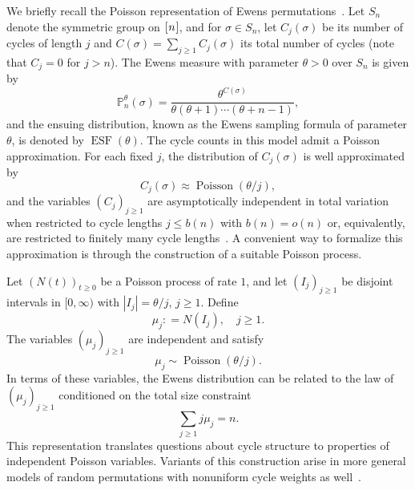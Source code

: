 \documentclass{amsart}
\theoremstyle{definition}
\theoremstyle{remark}
\numberwithin{equation}{section}
\newcommand{\mku}{\mkern1mu}
\newcommand{\deq}{\mathrel{\mathop:}=}
\DeclareMathOperator{\ESF}{ESF}
\DeclareMathOperator{\Poi}{Poisson}
\begin{document}
We briefly recall the Poisson representation of Ewens permutations~\cite{ABT2003,Arratia1992,Pitman2006}. Let $S_{n}$ denote the symmetric group on $[\mku{n}\mku]$, and for $\sigma \in S_{n}$, let $C_{j}(\sigma)$ be its number of cycles of length $j$ and $C(\sigma) = \sum_{j \ge 1} C_{j}(\sigma)$ its total number of cycles (note that $C_{j} = 0$ for $j>n$). The Ewens measure with parameter $\theta > 0$ over $S_{n}$ is given by
\begin{equation}
\mathbb{P}_{n}^{\theta}(\sigma) = 
\frac{\theta^{C(\sigma)}}{\theta(\theta+1)\cdots(\theta+n-1)},
\end{equation}
and the ensuing distribution, known as the Ewens sampling formula of parameter $\theta$, is denoted by $\ESF(\theta)$. The cycle counts in this model admit a Poisson approximation. For each fixed $j$, the distribution of $C_{j}(\sigma)$ is well approximated by
\begin{equation}
C_{j}(\sigma) \approx \Poi(\theta/j),
\end{equation}
and the variables $(C_{j})_{j \ge 1}$ are asymptotically independent in total variation when restricted to cycle lengths $j \le b(n)$ with $b(n) = o(n)$ or, equivalently, are restricted to finitely many cycle lengths~\cite{Arratia1992,Pitman2006}. A convenient way to formalize this approximation is through the construction of a suitable Poisson process.

Let $(N(t))_{t \ge 0}$ be a Poisson process of rate $1$, and let $(I_j)_{j \ge 1}$ be disjoint intervals in $[0,\infty)$ with $|I_j| = \theta/j$, $j \ge 1$. Define
\begin{equation}
\mu_{j} \deq N(I_{j}), \quad j \ge 1.
\end{equation}
The variables $(\mu_{j})_{j \ge 1}$ are independent and satisfy
\begin{equation}
\mu_{j} \sim \Poi(\theta/j).
\end{equation}
In terms of these variables, the Ewens distribution can be related to the law of $(\mu_j)_{j \ge 1}$ conditioned on the total size constraint
\begin{equation}
\label{eq:jmu}
\sum_{j \ge 1} j\mu_{j} = n.
\end{equation}
This representation translates questions about cycle structure to properties of independent Poisson variables. Variants of this construction arise in more general models of random permutations with nonuniform cycle weights as well~\cite{Ercolani2014}.
\end{document}
